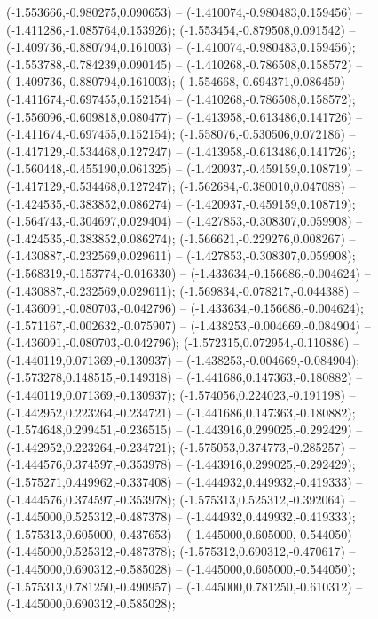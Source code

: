  (-1.553666,-0.980275,0.090653) -- (-1.410074,-0.980483,0.159456) -- (-1.411286,-1.085764,0.153926);
 (-1.553454,-0.879508,0.091542) -- (-1.409736,-0.880794,0.161003) -- (-1.410074,-0.980483,0.159456);
 (-1.553788,-0.784239,0.090145) -- (-1.410268,-0.786508,0.158572) -- (-1.409736,-0.880794,0.161003);
 (-1.554668,-0.694371,0.086459) -- (-1.411674,-0.697455,0.152154) -- (-1.410268,-0.786508,0.158572);
 (-1.556096,-0.609818,0.080477) -- (-1.413958,-0.613486,0.141726) -- (-1.411674,-0.697455,0.152154);
 (-1.558076,-0.530506,0.072186) -- (-1.417129,-0.534468,0.127247) -- (-1.413958,-0.613486,0.141726);
 (-1.560448,-0.455190,0.061325) -- (-1.420937,-0.459159,0.108719) -- (-1.417129,-0.534468,0.127247);
 (-1.562684,-0.380010,0.047088) -- (-1.424535,-0.383852,0.086274) -- (-1.420937,-0.459159,0.108719);
 (-1.564743,-0.304697,0.029404) -- (-1.427853,-0.308307,0.059908) -- (-1.424535,-0.383852,0.086274);
 (-1.566621,-0.229276,0.008267) -- (-1.430887,-0.232569,0.029611) -- (-1.427853,-0.308307,0.059908);
 (-1.568319,-0.153774,-0.016330) -- (-1.433634,-0.156686,-0.004624) -- (-1.430887,-0.232569,0.029611);
 (-1.569834,-0.078217,-0.044388) -- (-1.436091,-0.080703,-0.042796) -- (-1.433634,-0.156686,-0.004624);
 (-1.571167,-0.002632,-0.075907) -- (-1.438253,-0.004669,-0.084904) -- (-1.436091,-0.080703,-0.042796);
 (-1.572315,0.072954,-0.110886) -- (-1.440119,0.071369,-0.130937) -- (-1.438253,-0.004669,-0.084904);
 (-1.573278,0.148515,-0.149318) -- (-1.441686,0.147363,-0.180882) -- (-1.440119,0.071369,-0.130937);
 (-1.574056,0.224023,-0.191198) -- (-1.442952,0.223264,-0.234721) -- (-1.441686,0.147363,-0.180882);
 (-1.574648,0.299451,-0.236515) -- (-1.443916,0.299025,-0.292429) -- (-1.442952,0.223264,-0.234721);
 (-1.575053,0.374773,-0.285257) -- (-1.444576,0.374597,-0.353978) -- (-1.443916,0.299025,-0.292429);
 (-1.575271,0.449962,-0.337408) -- (-1.444932,0.449932,-0.419333) -- (-1.444576,0.374597,-0.353978);
 (-1.575313,0.525312,-0.392064) -- (-1.445000,0.525312,-0.487378) -- (-1.444932,0.449932,-0.419333);
 (-1.575313,0.605000,-0.437653) -- (-1.445000,0.605000,-0.544050) -- (-1.445000,0.525312,-0.487378);
 (-1.575312,0.690312,-0.470617) -- (-1.445000,0.690312,-0.585028) -- (-1.445000,0.605000,-0.544050);
 (-1.575313,0.781250,-0.490957) -- (-1.445000,0.781250,-0.610312) -- (-1.445000,0.690312,-0.585028);
